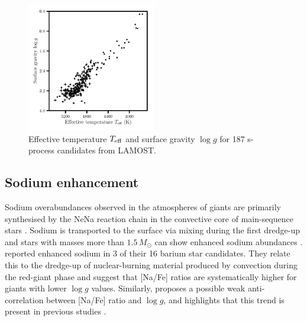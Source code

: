 \documentclass[a4paper,fleqn,usenatbib]{mnras}
\begin{document}
\begin{figure}
	\includegraphics[width=0.5\textwidth]{hrd_new.pdf}
    \caption{Effective temperature $T_{\rm eff}$ and surface gravity $\log{g}$ for 187 s-process candidates from LAMOST.}
    \label{fig:figure2}
\end{figure}

\subsection{Sodium enhancement}
Sodium overabundances observed in the atmospheres of giants are primarily synthesised by the NeNa reaction chain in the convective core of main-sequence stars \citep{el1995}. Sodium is transported to the surface via mixing during the first dredge-up and stars with masses more than $1.5\,M_\odot$ can show enhanced sodium abundances \citep{denissenkov1987,smiljanic2012}. \citet{antipova2004} reported  enhanced sodium in 3 of their 16 barium star candidates. They relate this to the dredge-up of nuclear-burning material produced by convection during the red-giant phase and suggest that [Na/Fe] ratios are systematically higher for giants with lower $\log{g}$ values. Similarly, \citet{decastro2016} proposes a possible weak anti-correlation between [Na/Fe] ratio and $\log{g}$, and highlights that this trend is present in previous studies \citep[e.g.,][]{boyarchuk2002,mishenina2006,luck2007,takeda2008}.
\end{document}

